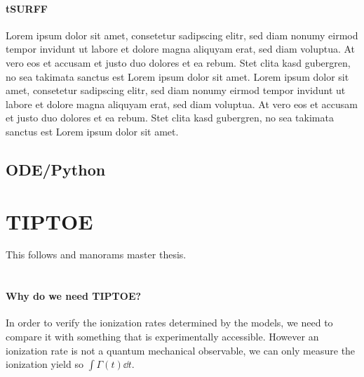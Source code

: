 \paragraph{tSURFF}
Lorem ipsum dolor sit amet, consetetur sadipscing elitr, sed diam nonumy eirmod tempor invidunt ut labore et dolore magna aliquyam erat, sed diam voluptua. At vero eos et accusam et justo duo dolores et ea rebum. Stet clita kasd gubergren, no sea takimata sanctus est Lorem ipsum dolor sit amet. Lorem ipsum dolor sit amet, consetetur sadipscing elitr, sed diam nonumy eirmod tempor invidunt ut labore et dolore magna aliquyam erat, sed diam voluptua. At vero eos et accusam et justo duo dolores et ea rebum. Stet clita kasd gubergren, no sea takimata sanctus est Lorem ipsum dolor sit amet.







\subsection{ODE/Python}





\section{TIPTOE}
This follows \cite{Park:18} and manorams master thesis.\\\\
\paragraph{Why do we need TIPTOE?} 
In order to verify the ionization rates determined by the models, we need to compare it with something that is experimentally accessible.
However an ionization rate is not a quantum mechanical observable, we can only measure the ionization yield so $\int \Gamma(t) \dd t$.

